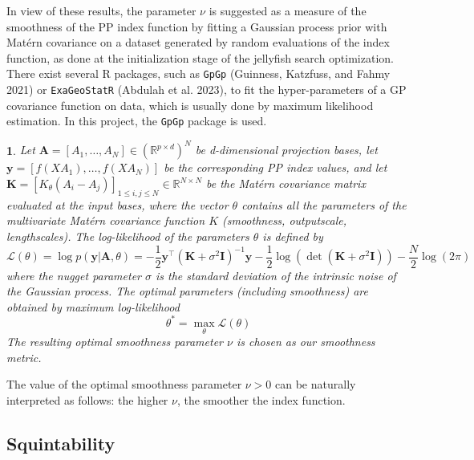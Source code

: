 \documentclass[
  12pt,
]{interact}
\theoremstyle{plain}
\newtheorem{defn}{\protect\definitionname}
\providecommand{\definitionname}{Definition}
\begin{document}
In view of these results, the parameter \(\nu\) is suggested as a
measure of the smoothness of the PP index function by fitting a Gaussian
process prior with Matérn covariance on a dataset generated by random
evaluations of the index function, as done at the initialization stage
of the jellyfish search optimization. There exist several R packages,
such as \texttt{GpGp} (Guinness, Katzfuss, and Fahmy 2021) or
\texttt{ExaGeoStatR} (Abdulah et al. 2023), to fit the hyper-parameters
of a GP covariance function on data, which is usually done by maximum
likelihood estimation. In this project, the \texttt{GpGp} package is
used.

\begin{defn}
Let $\mathbf{A}=[A_1, \ldots, A_N] \in (\mathbb{R}^{p \times d})^N$ be d-dimensional projection bases, let $\mathbf{y}=[f(XA_1),\ldots,f(XA_N)]$ be the corresponding PP index values, and let $\mathbf{K}=[K_\theta(A_{i}-A_{j})]_{1\leq i,j\leq N}\in\mathbb{R}^{N\times N}$ be the Matérn covariance matrix evaluated at the input bases, where the vector $\theta$ contains all the parameters of the multivariate Matérn covariance function $K$ (smoothness, outputscale, lengthscales). The log-likelihood of the parameters $\theta$ is defined by 
\begin{equation}
\mathcal{L}(\theta)=\log p(\mathbf{y}\left|\mathbf{A},\theta\right.)=-\frac{1}{2}\mathbf{y}^{\top}(\mathbf{K}+\sigma^{2}\mathbf{I})^{-1}\mathbf{y}-\frac{1}{2}\mathrm{\log}(\det(\mathbf{K}+\sigma^{2}\mathbf{I}))-\frac{N}{2}\log(2\pi)\, \label{eq:gp_log_likelihood}
\end{equation}
where the nugget parameter $\sigma$ is the standard deviation of the intrinsic noise of the Gaussian process.
The optimal parameters (including smoothness) are obtained by maximum log-likelihood
\begin{equation}
\theta^* = \underset{\theta}{\max}\mathcal{L}(\theta)
\end{equation}
The resulting optimal smoothness parameter $\nu$ is chosen as our smoothness metric.
\end{defn}

The value of the optimal smoothness parameter \(\nu>0\) can be naturally
interpreted as follows: the higher \(\nu\), the smoother the index
function.

\hypertarget{sec-squintability}{%
\subsection{Squintability}\label{sec-squintability}}
\end{document}
